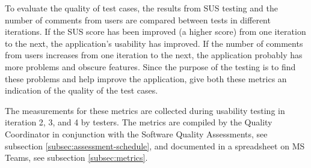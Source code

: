 To evaluate the quality of test cases, the results from SUS testing and the number of comments from users are compared between tests in different iterations. If the SUS score has been improved (a higher score) from one iteration to the next, the application's usability has improved. If the number of comments from users increases from one iteration to the next, the application probably has more problems and obscure features. Since the purpose of the testing is to find these problems and help improve the application, give both these metrics an indication of the quality of the test cases.

The measurements for these metrics are collected during usability testing in iteration 2, 3, and 4 by testers. The metrics are compiled by the Quality Coordinator in conjunction with the Software Quality Assessments, see subsection \ref{subsec:assessment-schedule}, and documented in a spreadsheet on MS Teams, see subsection \ref{subsec:metrics}.